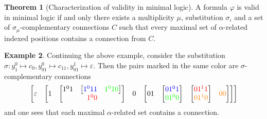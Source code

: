 \documentclass[11pt]{article}
\theoremstyle{definition}
\newtheorem{theorem}{Theorem}[section]
\theoremstyle{definition}
\theoremstyle{definition}
\theoremstyle{definition}
\theoremstyle{definition}
\theoremstyle{definition}
\newtheorem{example}[theorem]{Example}
\theoremstyle{definition}
\begin{document}
	\begin{theorem}[Characterization of validity in minimal logic]
		A formula $\varphi$ is valid in minimal logic if and only there exists a multiplicity $\mu$, substitution $\sigma_\iota$ and a set of $\sigma_\mu$-complementary connections $C$ such that every maximal set of $\alpha$-related indexed positions contains a connection from $C$.
	\end{theorem}

	\begin{example}
		Continuing the above example, consider the substitution $\sigma: y_1^0\mapsto c_0, y_{01}^0\mapsto c_{11}, y_{01}^1\mapsto \varepsilon$. Then the pairs marked in the same color are $\sigma$-complementary connections
		\[
		\begin{bmatrix}
			\varepsilon &
			\begin{bmatrix}
				1 &
				\begin{bmatrix}
					\begin{matrix}
						1^01 & \begin{bmatrix}
							{\color{blue}1^011} & {\color{green}1^010}
						\end{bmatrix}
					\end{matrix} \\ {\color{red}1^00}
				\end{bmatrix} &
				0 &
				\begin{bmatrix}
					01 &
					\begin{bmatrix}
						{\color{blue}01^01} \\ {\color{green}01^00}
					\end{bmatrix} &
					\begin{bmatrix}
						{\color{red}01^11} \\ {\color{orange}01^10}
					\end{bmatrix} &
					{\color{orange}00}
				\end{bmatrix}
			\end{bmatrix}
		\end{bmatrix}
		\]
		and one sees that each maximal $\alpha$-related set contains a connection.
	\end{example}
\end{document}
